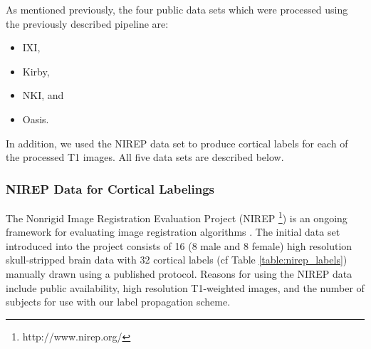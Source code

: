 As mentioned previously, the four public data sets which were processed
using the previously described pipeline are:
\begin{itemize}
  \item IXI,
  \item Kirby,
  \item NKI, and
  \item Oasis.
\end{itemize}
In addition, we used the NIREP data set to produce cortical labels for 
each of the processed T1 images.  All five data sets are described below.

%
%

\subsubsection{NIREP Data for Cortical Labelings}

The Nonrigid Image Registration Evaluation Project (NIREP%
\footnote{
http://www.nirep.org/
}) 
is an ongoing framework for evaluating image registration algorithms \citep{christensen2006}.
The initial data set introduced into the project consists of 
16 (8 male and 8 female) high resolution skull-stripped brain 
data with 32 cortical labels (cf Table \ref{table:nirep_labels}) manually drawn using a 
published protocol.  Reasons for using the NIREP data include
public availability, high resolution T1-weighted images, and 
the number of subjects for use with our label propagation scheme.

